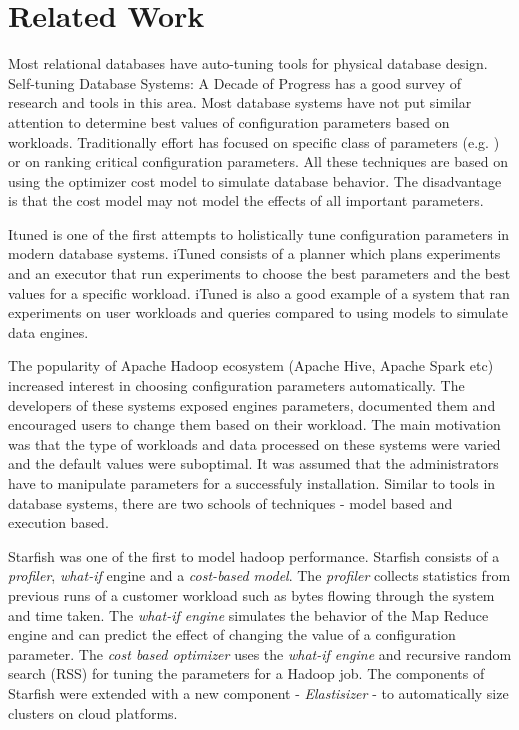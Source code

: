 \section{Related Work}
\label{sec:relatedwork}
Most relational databases have auto-tuning tools for physical database design. 
Self-tuning Database Systems: A Decade of Progress\cite{Chaudhuri:2007:SDS:1325851.1325856}
 has a good survey of research and tools in this area. Most database systems have 
not put similar attention to determine best values of configuration parameters 
based on workloads. Traditionally effort has focused on specific class of parameters 
(e.g.\cite{Storm:2006:ASM:1182635.1164220} ) or on ranking
critical configuration parameters\cite{DBLP:conf/icde/DebnathLM08}. All these techniques
are based on using the optimizer cost model to simulate database behavior. The disadvantage is
that the cost model may not model the effects of all important parameters.

Ituned\cite{Duan:2009:TDC:1687627.1687767} is one of the first attempts to holistically 
tune configuration parameters in modern database systems. iTuned consists of a planner
which plans experiments and an executor that run experiments to choose the best parameters
and the best values for a specific workload. iTuned is also a good example of a system that
ran experiments on user workloads and queries compared to using models to simulate data engines.

The popularity of Apache Hadoop ecosystem (Apache Hive, Apache Spark etc) increased interest
in choosing configuration parameters automatically. The developers of these systems exposed
engines parameters, documented them and encouraged users to change them based on their workload.
The main motivation was that the type of workloads and data processed on these systems were varied
and the default values were suboptimal. It was assumed that the administrators have to manipulate
parameters for a successfuly installation. Similar to tools in database systems, there are two schools
of techniques - model based and execution based.

Starfish\cite{herodotou2011starfish} was one of the first to model hadoop performance. Starfish 
consists of a \textit{profiler}, \textit{what-if} engine and a \textit{cost-based model}\cite{herodotou2011profiling}. 
The \textit{profiler} collects statistics from previous runs of a customer workload 
such as bytes flowing through the system and time taken. The \textit{what-if engine} simulates 
the behavior of the Map Reduce engine and can predict the effect of changing the value 
of a configuration parameter. The \textit{cost based optimizer} uses the \textit{what-if engine}
and recursive random search (RSS) for tuning the parameters for a Hadoop job. The components of
Starfish were extended with a new component - \textit{Elastisizer}\cite{Herodotou:2011:NOS:2038916.2038934}
- to automatically size clusters on cloud platforms.  

